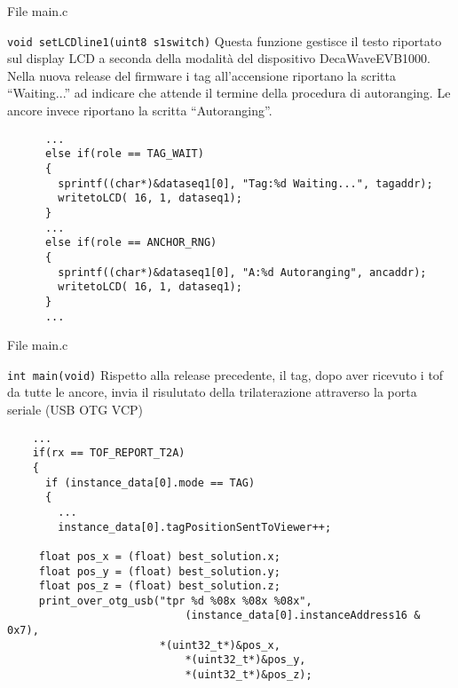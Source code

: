\begin{frame}[fragile, shrink=15]{File main.c}
  \begin{block}{\lstinline!void setLCDline1(uint8 s1switch)!}
    Questa funzione gestisce il testo riportato sul display LCD a seconda
    della modalità del dispositivo DecaWaveEVB1000.\\
    Nella nuova release del firmware i tag all'accensione riportano la scritta
    ``Waiting...'' ad indicare che attende il termine della procedura di autoranging.
    Le ancore invece riportano la scritta ``Autoranging''.
    \begin{lstlisting}
      ...
      else if(role == TAG_WAIT)
      {
        sprintf((char*)&dataseq1[0], "Tag:%d Waiting...", tagaddr);
        writetoLCD( 16, 1, dataseq1);
      }
      ...
      else if(role == ANCHOR_RNG)
      {
        sprintf((char*)&dataseq1[0], "A:%d Autoranging", ancaddr);
        writetoLCD( 16, 1, dataseq1);
      }
      ...
    \end{lstlisting}
  \end{block}
\end{frame}

\begin{frame}[fragile, shrink=30]{File main.c}
  \begin{block}{\lstinline!int main(void)!}
    Rispetto alla release precedente, il tag, dopo aver ricevuto i tof da tutte le ancore,
    invia il risulutato della trilaterazione attraverso la porta seriale (USB OTG VCP)
    \begin{lstlisting}
    ...  
    if(rx == TOF_REPORT_T2A)
    {
      if (instance_data[0].mode == TAG)
      {
        ...
        instance_data[0].tagPositionSentToViewer++;

  	 float pos_x = (float) best_solution.x;
	 float pos_y = (float) best_solution.y;
	 float pos_z = (float) best_solution.z;
	 print_over_otg_usb("tpr %d %08x %08x %08x",
                            (instance_data[0].instanceAddress16 & 0x7),
	                    *(uint32_t*)&pos_x,
                            *(uint32_t*)&pos_y,
                            *(uint32_t*)&pos_z);
    \end{lstlisting}
  \end{block}
\end{frame}

